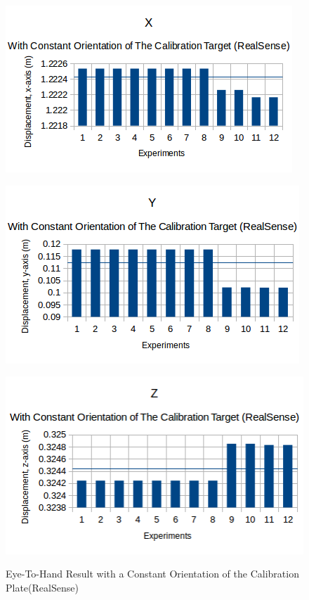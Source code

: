 \begin{figure}[htp]
\begin{center}
{
  \includegraphics[clip,width=0.5\columnwidth]{figures/constantorientation_real_x.png}%
}
\end{center}
\begin{center}
{
  \includegraphics[clip,width=0.5\columnwidth]{figures/constantorientation_real_y.png}%
}
\end{center}

\begin{center}
{
  \includegraphics[clip,width=0.5\columnwidth]{figures/constantorientation_real_z.png}%
}
\end{center}
\caption{Eye-To-Hand Result with a Constant Orientation of the Calibration Plate(RealSense)}
\end{figure}

